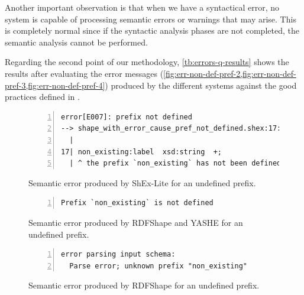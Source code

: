Another important observation is that when we have a syntactical error,
no system is capable of processing semantic errors or warnings that may
arise. This is completely normal since if the syntactic analysis phases
are not completed, the semantic analysis cannot be performed.

Regarding the second point of our methodology, \cref{tb:errors-q-results}
shows the results after evaluating the error messages (\cref{fig:err-non-def-pref-2,fig:err-non-def-pref-3,fig:err-non-def-pref-4})
produced by the different systems against the good practices defined in \cite{heeren2005top}.

\begin{figure}
  \begin{lstlisting}[numbers=left,basicstyle=\ttfamily\scriptsize]
error[E007]: prefix not defined
--> shape_with_error_cause_pref_not_defined.shex:17:3
  |
17| non_existing:label  xsd:string  +;
  | ^ the prefix `non_existing` has not been defined
  \end{lstlisting}
  \caption[Semantic error produced by ShEx-Lite for an undefined prefix]{Semantic error produced by ShEx-Lite for an undefined prefix.}
  \label{fig:err-non-def-pref-2}
\end{figure}

\begin{figure}
  \begin{lstlisting}[numbers=left,basicstyle=\ttfamily\scriptsize]
Prefix `non_existing` is not defined
  \end{lstlisting}
  \caption[Semantic error produced by RDFShape and YASHE for an undefined prefix]{Semantic error produced by RDFShape and YASHE for an undefined prefix.}
  \label{fig:err-non-def-pref-3}
\end{figure}

\begin{figure}[t]
  \begin{lstlisting}[numbers=left,basicstyle=\ttfamily\scriptsize]
error parsing input schema:
  Parse error; unknown prefix "non_existing"
  \end{lstlisting}
  \caption[Semantic error produced by RDFShape for an undefined prefix]{Semantic error produced by RDFShape for an undefined prefix.}
  \label{fig:err-non-def-pref-4}
\end{figure}

